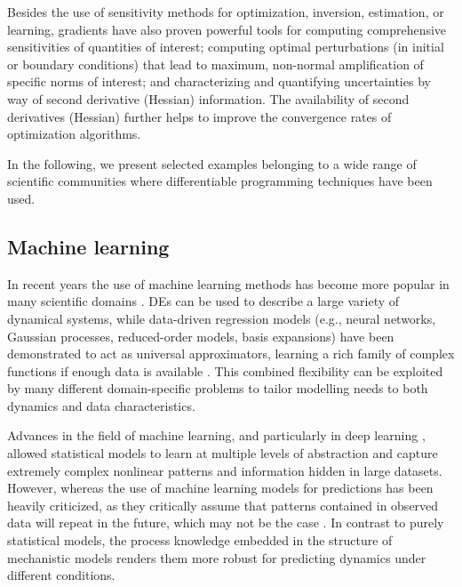 Besides the use of sensitivity methods for optimization, inversion, estimation, or learning, gradients have also proven powerful tools for computing comprehensive sensitivities of quantities of interest; computing optimal perturbations (in initial or boundary conditions) that lead to maximum, non-normal amplification of specific norms of interest; and characterizing and quantifying uncertainties by way of second derivative (Hessian) information.
The availability of second derivatives (Hessian) further helps to improve the convergence rates of optimization algorithms.

In the following, we present selected examples belonging to a wide range of scientific communities where differentiable programming techniques have been used. 

\subsection{Machine learning}

In recent years the use of machine learning methods has become more popular in many scientific domains \cite{rasp2018, pichler2023, meuwly2021machine, borowiec2022}. 
DEs can be used to describe a large variety of dynamical systems, while data-driven regression models (e.g., neural networks, Gaussian processes, reduced-order models, basis expansions) have been demonstrated to act as universal approximators, learning a rich family of complex functions if enough data is available \cite{gorban_1998}. 
This combined flexibility can be exploited by many different domain-specific problems to tailor modelling needs to both dynamics and data characteristics.

Advances in the field of machine learning, and particularly in deep learning \cite{LeCun2015}, allowed statistical models to learn at multiple levels of abstraction and capture extremely complex nonlinear patterns and information hidden in large datasets. 
However, whereas the use of machine learning models for predictions has been heavily criticized, as they critically assume that patterns contained in observed data will repeat in the future, which may not be the case \cite{dormann2007,Barnosky2012}. 
In contrast to purely statistical models, the process knowledge embedded in the structure of mechanistic models renders them more robust for predicting dynamics under different conditions.

